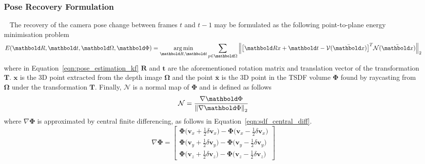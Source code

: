 \subsubsection{Pose Recovery Formulation}
~\label{subsub:moseg_static_camera_poserec}
The recovery of the camera pose change between frames \(t\) and \(t-1\) may be
formulated as the following point-to-plane energy minimisation problem
\begin{equation}
  \label{eqn:pose_estimation_kf}
  E(\bm{R}, \bm{t}, \bm{\Omega}, \bm{\Phi}) =
  \argmin_{\bm{R}, \bm{t}} \sum_{p \in \bm{\Omega}}
  \norm{{\left[
    \bm{Rx} + \bm{t} - \mathcal{V}(\bar{\bm{x}})
  \right]}^{T}
  \mathcal{N}(\bar{\bm{x}})}
\end{equation}
where in Equation~\ref{eqn:pose_estimation_kf} \(\bm{R}\) and \(\bm{t}\) are 
the aforementioned rotation matrix and translation vector of the transformation 
\(\bm{T}\). \(\bm{x}\) is the 3D point extracted from the depth image 
\(\bm{\Omega}\) and the point \(\bar{\bm{x}}\) is the 3D point in the TSDF 
volume \(\bm{\Phi}\) found by raycasting from \(\bm{\Omega}\) under the 
transformation \(\bm{T}\). Finally, \(\mathcal{N}\) is a normal map of 
\(\bm{\Phi}\) and is defined as follows
\begin{equation}
  \label{eqn:normal_map_definition}
  \mathcal{N} = \frac{\nabla \bm{\Phi}}{\norm{\nabla \bm{\Phi}}}
\end{equation}
where \(\nabla \bm{\Phi}\) is approximated by central finite differencing, 
as follows in Equation~\ref{eqn:sdf_central_diff}.
\begin{equation}
  \label{eqn:sdf_central_diff}
  \nabla \bm{\Phi} = 
    \begin{bmatrix}
      \bm{\Phi} \big(\bm{v}_{x} + \frac{1}{2}\delta \bm{v}_{x}\big) -
      \bm{\Phi} \big(\bm{v}_{x} - \frac{1}{2}\delta \bm{v}_{x}\big)\\
      \bm{\Phi} \big(\bm{v}_{y} + \frac{1}{2}\delta \bm{v}_{y}\big) -
      \bm{\Phi} \big(\bm{v}_{y} - \frac{1}{2}\delta \bm{v}_{y}\big)\\
      \bm{\Phi} \big(\bm{v}_{z} + \frac{1}{2}\delta \bm{v}_{z}\big) -
      \bm{\Phi} \big(\bm{v}_{z} - \frac{1}{2}\delta \bm{v}_{z}\big)
    \end{bmatrix}
\end{equation}

